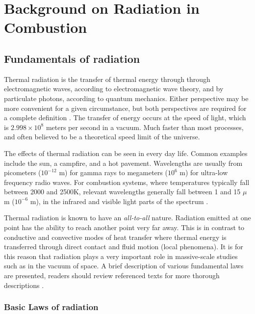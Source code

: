 \addchapheadtotoc
\chapter{Background on Radiation in Combustion}\label{chapter:Importance}

\section{Fundamentals of radiation} \label{Sec:FundOfRad}
Thermal radiation is the transfer of thermal energy through through electromagnetic waves, according to electromagnetic wave theory, and by particulate photons, according to quantum mechanics. 
Either perspective may be more convenient for a given circumstance, but both perspectives are required for a complete definition \cite{Modest2013RadiativeTransfer}. The transfer of energy occurs at the speed of light, which is $2.998 \times 10^8$ meters per second in a vacuum.
Much faster than most processes, and often believed to be a theoretical speed limit of the universe.

The effects of thermal radiation can be seen in every day life. Common examples include the sun, a campfire, and a hot pavement. 
Wavelengths are usually from picometers ($10^{-12}$ m) for gamma rays to megameters ($10^6$ m) for ultra-low frequency radio waves.
For combustion systems, where temperatures typically fall between 2000 and 2500K, relevant wavelengths generally fall between 1 and 15 $\mu{}$m ($10^{-6}$ m), in the infrared and visible light parts of the spectrum \cite{Liu2020TheFlames}.

Thermal radiation is known to have an \textit{all-to-all} nature. Radiation emitted at one point has the ability to reach another point very far away. 
This is in contrast to conductive and convective modes of heat transfer where thermal energy is transferred through direct contact and fluid motion (local phenomena). 
It is for this reason that radiation plays a very important role in massive-scale studies such as in the vacuum of space.
A brief description of various fundamental laws are presented,
readers should review referenced texts for more thorough descriptions \cite{Howell2010ThermalTransfer,Modest2013RadiativeTransfer}.

\subsection{Basic Laws of radiation}\label{section:BasicLaws}

